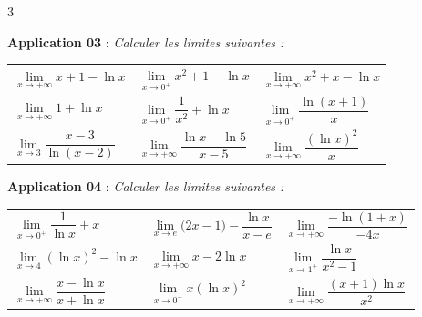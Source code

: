 \documentclass[a4paper,landscape]{article}
\renewcommand{\small}{\fontsize{6}{7}\selectfont}
\begin{document}
\begin{multicols}{3}
\columnbreak

\columnbreak

\noindent\colorbox{jaune}{\textbf{Application 03}} : \textit{Calculer les limites suivantes :}
\vspace{2mm}

\begin{minipage}{\columnwidth}
\centering
\small
\begin{tabular}{@{}p{}p{}p{}@{}}
$\lim\limits_{x \to +\infty} x + 1 - \ln x$ &
$\lim\limits_{x \to 0^+} x^2 + 1 - \ln x$ &
$\lim\limits_{x \to +\infty} x^2 + x - \ln x$ \\[10pt]

$\lim\limits_{x \to +\infty} 1 + \ln x$ &
$\lim\limits_{x \to 0^+} \dfrac{1}{x^2} + \ln x$ &
$\lim\limits_{x \to 0^+} \dfrac{\ln(x+1)}{x}$ \\[10pt]

$\lim\limits_{x \to 3} \dfrac{x-3}{\ln(x-2)}$ &
$\lim\limits_{x \to +\infty} \dfrac{\ln x - \ln 5}{x-5}$ &
$\lim\limits_{x \to +\infty} \dfrac{(\ln x)^2}{x}$
\end{tabular}
\end{minipage}
\vspace{5mm}

\noindent\colorbox{jaune}{\textbf{Application 04}} : \textit{Calculer les limites suivantes :}
\vspace{2mm}

\begin{minipage}{\columnwidth}
\centering
\small
\begin{tabular}{@{}p{}p{}p{}@{}}
$\lim\limits_{x \to 0^+} \dfrac{1}{\ln x} + x$ &
$\lim\limits_{x \to e} \bigl(2x-1\bigr) - \dfrac{\ln x}{x-e}$ &
$\lim\limits_{x \to +\infty} \dfrac{-\ln(1+x)}{-4x}$ \\[10pt]

$\lim\limits_{x \to 4} (\ln x)^2 - \ln x$ &
$\lim\limits_{x \to +\infty} x - 2\ln x$ &
$\lim\limits_{x \to 1^+} \dfrac{\ln x}{x^2-1}$ \\[10pt]

$\lim\limits_{x \to +\infty} \dfrac{x - \ln x}{x + \ln x}$ &
$\lim\limits_{x \to 0^+} x(\ln x)^2$ &
$\lim\limits_{x \to +\infty} \dfrac{(x+1)\ln x}{x^2}$
\end{tabular}
\end{minipage}
\vspace{5mm}


\end{multicols}
\end{document}
